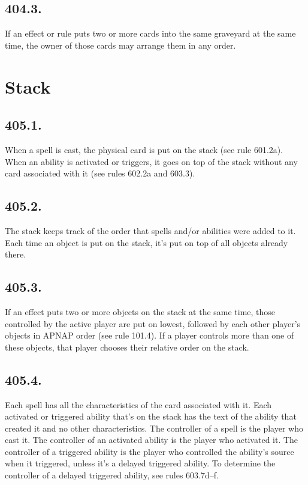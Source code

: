 \subsection*{404.3.}
If an effect or rule puts two or more cards into the same graveyard at the same time, the owner of those cards may arrange them in any order.

\section{Stack}
\subsection*{405.1.}
When a spell is cast, the physical card is put on the stack (see rule 601.2a). When an ability is activated or triggers, it goes on top of the stack without any card associated with it (see rules 602.2a and 603.3).

\subsection*{405.2.}
The stack keeps track of the order that spells and/or abilities were added to it. Each time an object is put on the stack, it’s put on top of all objects already there.

\subsection*{405.3.}
If an effect puts two or more objects on the stack at the same time, those controlled by the active player are put on lowest, followed by each other player’s objects in APNAP order (see rule 101.4). If a player controls more than one of these objects, that player chooses their relative order on the stack.

\subsection*{405.4.}
Each spell has all the characteristics of the card associated with it. Each activated or triggered ability that’s on the stack has the text of the ability that created it and no other characteristics. The controller of a spell is the player who cast it. The controller of an activated ability is the player who activated it. The controller of a triggered ability is the player who controlled the ability’s source when it triggered, unless it’s a delayed triggered ability. To determine the controller of a delayed triggered ability, see rules 603.7d–f.

